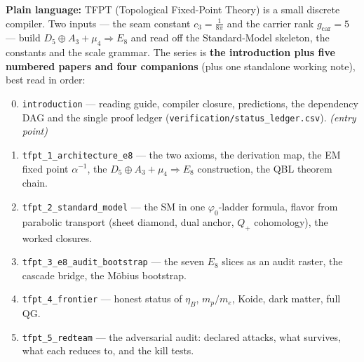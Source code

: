 \begin{navbox}
\textbf{Plain language:} TFPT (Topological Fixed-Point Theory) is a small discrete compiler. Two
inputs --- the seam constant $c_3=\tfrac1{8\pi}$ and the carrier rank $g_{\mathrm{car}}=5$ --- build
$D_5\oplus A_3+\mu_4\Rightarrow E_8$ and read off the Standard-Model skeleton, the constants and the
scale grammar. The series is \textbf{the introduction plus five numbered papers and four companions}
(plus one standalone working note), best read in order:
\begin{enumerate}[leftmargin=2.0em,itemsep=1pt,label=\textbf{\arabic*.}]
\setcounter{enumi}{-1}
\item \texttt{introduction} --- reading guide, compiler closure, predictions, the dependency DAG and the
      single proof ledger (\texttt{verification/status\_ledger.csv}). \emph{(entry point)}
\item \texttt{tfpt\_1\_architecture\_e8} --- the two axioms, the derivation map, the EM fixed point
      $\alpha^{-1}$, the $D_5\oplus A_3+\mu_4\Rightarrow E_8$ construction, the QBL theorem chain.
\item \texttt{tfpt\_2\_standard\_model} --- the SM in one $\varphi_0$-ladder formula, flavor from
      parabolic transport (sheet diamond, dual anchor, $Q_+$ cohomology), the worked closures.
\item \texttt{tfpt\_3\_e8\_audit\_bootstrap} --- the seven $E_8$ slices as an audit raster, the cascade
      bridge, the M\"obius bootstrap.
\item \texttt{tfpt\_4\_frontier} --- honest status of $\eta_B$, $m_p/m_e$, Koide, dark matter, full QG.
\item \texttt{tfpt\_5\_redteam} --- the adversarial audit: declared attacks, what survives, what each
      reduces to, and the kill tests.
\end{enumerate}

\end{navbox}
